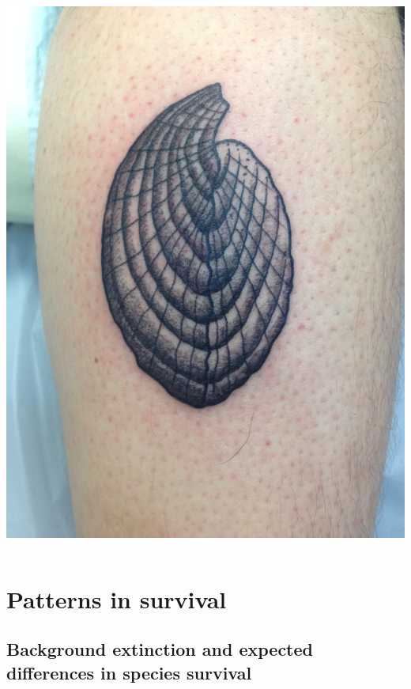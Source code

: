 \documentclass{beamer}
\begin{document}
\begin{frame}
\begin{columns}
\begin{column}{0.5\textwidth}
\begin{center}
        \includegraphics[height = 0.6\textheight, keepaspectratio = true]{figure/tattoo}
      \end{center}
    \end{column}
  \end{columns}
\end{frame}


\section{Patterns in survival}
\subsection{Background extinction and expected differences in species survival}
\end{document}
